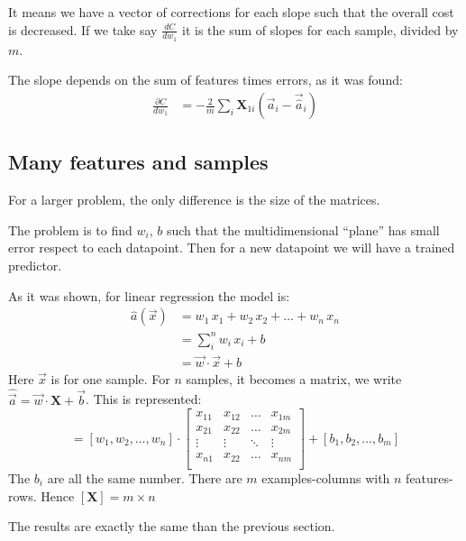 It means we have a vector of corrections for each slope such that the overall cost is decreased. If we take say $\frac{dC}{dw_1}$ it is the sum of slopes for each sample, divided by $m$. 

The slope depends on the sum of features times errors, as it was found: 
\begin{align*}
  \frac{\partial C}{dw_1}&= -\frac{2}{m}\sum_i \mathbf{X}_{1i}(\vec{a}_i-\vec{\hat{a}}_i)
\end{align*}


\subsection{Many features and samples}
For a larger problem, the only difference is the size of the matrices.

The problem is to find $w_i$, $b$ such that the multidimensional ``plane'' has small error respect to each datapoint. Then for a new datapoint we will have a trained predictor.

As it was shown, for linear regression the model is:
\begin{align*}
  \hat{a}(\vec{x}) &= w_1\,x_1 + w_2\,x_2 +\ldots+ w_n\,x_n\\
   &= \sum_i^n w_i\, x_i + b \\
   &= \vec{w}\cdot\vec{x} + b
\end{align*}
Here $\vec{x}$ is for one sample. For $n$ samples, it becomes a matrix, we write $\hat{\vec{a}} = \vec{w}\cdot\mathbf{X} + \vec{b}$. This is represented:
\begin{equation*}
  [a_1, a_2, \ldots, a_n] = 
  [w_1, w_2, \ldots, w_n] \cdot
  \begin{bmatrix}
    x_{11} & x_{12} & \ldots & x_{1m}\\
    x_{21} & x_{22} & \ldots & x_{2m}\\
    \vdots & \vdots & \ddots & \vdots\\
    x_{n1} & x_{22} & \ldots & x_{nm}\\
  \end{bmatrix}
  + [b_1, b_2, \ldots, b_m]
\end{equation*}
The $b_i$ are all the same number. There are $m$ examples-columns with $n$ features-rows. Hence $[\mathbf{X}] = m\times{}n$

The results are exactly the same than the previous section.
